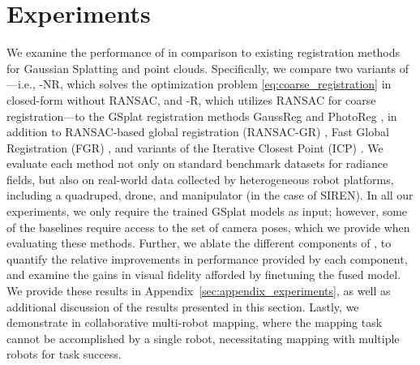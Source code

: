 \section{Experiments}
\label{sec:evaluation}
We examine the performance of \algname in comparison to existing registration methods for Gaussian Splatting and point clouds. Specifically, we compare two variants of \algname---i.e., \algname-NR, which solves the optimization problem \eqref{eq:coarse_registration} in closed-form without RANSAC, and \algname-R, which utilizes RANSAC for coarse registration---to the GSplat registration methods GaussReg \cite{chang2025gaussreg} and PhotoReg \cite{yuan2024photoreg}, in addition to RANSAC-based global registration (RANSAC-GR) \cite{fischler1981random, holz2015registration}, Fast Global Registration (FGR) \cite{zhou2016fast}, and variants of the Iterative Closest Point (ICP) \cite{rusinkiewicz2001efficient, park2017colored}. We evaluate each method not only on standard benchmark datasets for radiance fields, but also on real-world data collected by heterogeneous robot platforms, including a quadruped, drone, and manipulator (in the case of SIREN). In all our experiments, we only require the trained GSplat models as input; however, some of the baselines require access to the set of camera poses, which we provide when evaluating these methods.
Further, we ablate the different components of \algname, to quantify the relative improvements in performance provided by each component, and examine the gains in visual fidelity afforded by finetuning the fused model. We provide these results in Appendix~\ref{sec:appendix_experiments}, as well as additional discussion of the results presented in this section. 
Lastly, we demonstrate \algname in collaborative multi-robot mapping, where the mapping task cannot be accomplished by a single robot, necessitating mapping with multiple robots for task success. 

